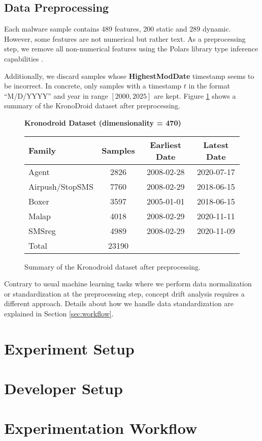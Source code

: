 \subsection{Data Preprocessing}
Each malware sample contains 489 features, 200 static and 289 dynamic. However, some features
are not numerical but rather text.
As a preprocessing step, we remove all non-numerical features using the Polars library
type inference capabilities \cite{polarsdatatypes}.

Additionally, we discard samples whose \textbf{HighestModDate} timestamp seems
to be incorrect. In concrete, only samples with a timestamp
$t$ in the format ``M/D/YYYY'' and year in range $[2000, 2025]$ are kept.
Figure \ref{fig:kronodroid_summary} shows a summary of the KronoDroid dataset
after preprocessing.

\begin{figure}[h!]
    \begin{center}
        \textbf{Kronodroid Dataset (dimensionality = 470)}
        \vspace{0.5cm}
        
        \begin{tabular}{lccc}
            \toprule
            \textbf{Family} & \textbf{Samples} & \textbf{Earliest Date} & \textbf{Latest Date} \\
            \midrule
            Agent               & 2826 & 2008-02-28 & 2020-07-17 \\
            Airpush/StopSMS     & 7760 & 2008-02-29 & 2018-06-15 \\
            Boxer               & 3597 & 2005-01-01 & 2018-06-15 \\
            Malap               & 4018 & 2008-02-29 & 2020-11-11 \\
            SMSreg              & 4989 & 2008-02-29 & 2020-11-09 \\
            \bottomrule
            Total             & 23190 \\
        \end{tabular}
        \caption{Summary of the Kronodroid dataset after preprocessing.}
        \label{fig:kronodroid_summary}
    \end{center}
\end{figure}

Contrary to usual machine learning tasks where we perform data normalization or standardization
at the preprocessing step, concept drift analysis requires a different approach. Details about
how we handle data standardization are explained in Section \ref{sec:workflow}.

\section{Experiment Setup}

\section{Developer Setup}

\section{Experimentation Workflow\label{sec:workflow}}
